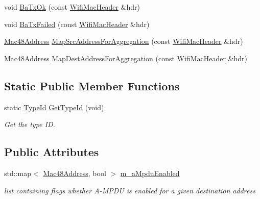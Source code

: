 \begin{DoxyCompactItemize}
\item 
void \hyperlink{classns3_1_1EdcaTxopN_a0bed35930ef1832e8f922d937b54c2cb}{Ba\+Tx\+Ok} (const \hyperlink{classns3_1_1WifiMacHeader}{Wifi\+Mac\+Header} \&hdr)
\item 
void \hyperlink{classns3_1_1EdcaTxopN_a9fd11cc1ac518f7bfef44591e4d711b4}{Ba\+Tx\+Failed} (const \hyperlink{classns3_1_1WifiMacHeader}{Wifi\+Mac\+Header} \&hdr)
\item 
\hyperlink{classns3_1_1Mac48Address}{Mac48\+Address} \hyperlink{classns3_1_1EdcaTxopN_adddb74b3fd751b59f79e2405ecbd513c}{Map\+Src\+Address\+For\+Aggregation} (const \hyperlink{classns3_1_1WifiMacHeader}{Wifi\+Mac\+Header} \&hdr)
\item 
\hyperlink{classns3_1_1Mac48Address}{Mac48\+Address} \hyperlink{classns3_1_1EdcaTxopN_a766951341864967a984075e33b0606c4}{Map\+Dest\+Address\+For\+Aggregation} (const \hyperlink{classns3_1_1WifiMacHeader}{Wifi\+Mac\+Header} \&hdr)
\end{DoxyCompactItemize}
\subsection*{Static Public Member Functions}
\begin{DoxyCompactItemize}
\item 
static \hyperlink{classns3_1_1TypeId}{Type\+Id} \hyperlink{classns3_1_1EdcaTxopN_a390cb5e9d1b2040a48e468da28f4cd43}{Get\+Type\+Id} (void)
\begin{DoxyCompactList}\small\item\em Get the type ID. \end{DoxyCompactList}\end{DoxyCompactItemize}
\subsection*{Public Attributes}
\begin{DoxyCompactItemize}
\item 
std\+::map$<$ \hyperlink{classns3_1_1Mac48Address}{Mac48\+Address}, bool $>$ \hyperlink{classns3_1_1EdcaTxopN_aacbbbb0f23485401937e97a93bbbfe37}{m\+\_\+a\+Mpdu\+Enabled}
\begin{DoxyCompactList}\small\item\em list containing flags whether A-\/\+M\+P\+DU is enabled for a given destination address \end{DoxyCompactList}\end{DoxyCompactItemize}

